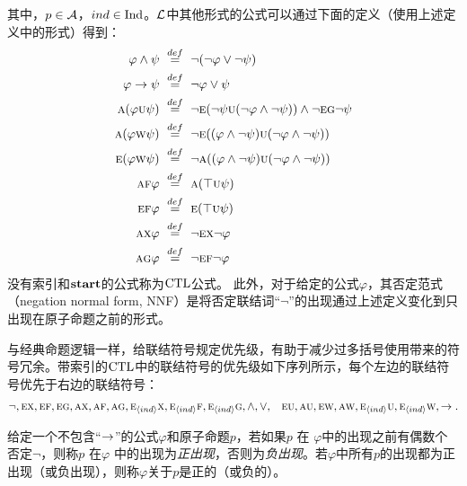 其中，$p\in {\cal A}$，$ind \in \textrm{Ind}$。$\cal L$中其他形式的公式可以通过下面的定义（使用上述定义中的形式）得到：
\begin{alignat}{2}
	\varphi \wedge \psi& \ \overset{def}{=}\ \neg (\neg \varphi \vee \neg \psi)\\
	\varphi \rto \psi& \ \overset{def}{=}\ \neg \varphi \vee \psi\\
	\ALL(\varphi \UNTILL \psi)& \ \overset{def}{=}\ \neg\EXIST(\neg \psi \UNTILL(\neg \varphi \wedge \neg \psi)) \wedge \neg \EXIST \GLOBAL \neg \psi\\
	\ALL(\varphi \UNLESS \psi)& \ \overset{def}{=}\  \neg\EXIST((\varphi \wedge \neg \psi) \UNTILL (\neg \varphi \wedge \neg \psi))\\
	\EXIST(\varphi \UNLESS \psi)& \ \overset{def}{=}\  \neg\ALL((\varphi \wedge \neg \psi) \UNTILL (\neg \varphi \wedge \neg \psi))\\
	\ALL\FUTURE \varphi& \ \overset{def}{=}\ 	\ALL(\top \UNTILL \psi)\\
	\EXIST\FUTURE \varphi& \ \overset{def}{=}\ \EXIST(\top \UNTILL \psi)\\
	\ALL \NEXT \varphi& \ \overset{def}{=}\  \neg \EXIST \NEXT \neg \varphi\\
	\ALL \GLOBAL \varphi& \ \overset{def}{=}\  \neg \EXIST \FUTURE \neg \varphi
\end{alignat}
没有索引和$\textbf{start}$的公式称为$\textrm{CTL}$公式。
此外，对于给定的公式$\varphi$，其否定范式（negation normal form, NNF）是将否定联结词“$\neg$”的出现通过上述定义变化到只出现在原子命题之前的形式。

与经典命题逻辑一样，给联结符号规定优先级，有助于减少过多括号使用带来的符号冗余。带索引的$\textrm{CTL}$中的联结符号的优先级如下序列所示，每个左边的联结符号优先于右边的联结符号：
\begin{align*}
	& \neg, \textsc{e}\textsc{x}, \textsc{e}\textsc{f}, \textsc{e}\textsc{g}, \textsc{a}\textsc{x}, \textsc{a}\textsc{f}, \textsc{a}\textsc{g}, \textsc{e}_{{\langle{ind}\rangle}}\textsc{x}, \textsc{e}_{{\langle{ind}\rangle}}\textsc{f}, \textsc{e}_{{\langle{ind}\rangle}}\textsc{g}
	,\land, \lor,
	& \textsc{e}\textsc{u}, \textsc{a}\textsc{u}, \textsc{e} \textsc{w}, \textsc{a}\textsc{w}, \textsc{e}_{{\langle{ind}\rangle}}\textsc{u}, \textsc{e}_{{\langle{ind}\rangle}} \textsc{w}, \rightarrow.
\end{align*}

给定一个不包含“$\rightarrow$”的公式$\varphi$和原子命题$p$，若如果$p$ 在 $\varphi$中的出现之前有偶数个否定$\neg$，则称$p$ 在$\varphi$ 中的出现为\emph{正出现}，否则为\emph{负出现}。若$\varphi$中所有$p$的出现都为正出现（或负出现），则称$\varphi$关于$p$是正的（或负的）。

